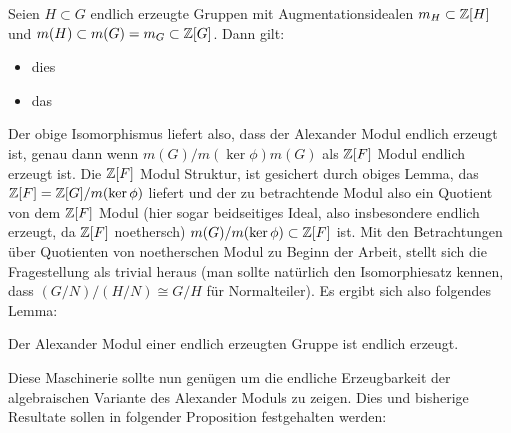 \begin{lem}[Augmentationsideale]
	Seien $H\subset G$ endlich erzeugte Gruppen mit Augmentationsidealen $m_H\subset \mathbb{Z}[H]$ und $m(H)\subset m(G)=m_G\subset \mathbb{Z}[G]$. Dann gilt:
	\begin{itemize}
		\item dies
		\item das
	\end{itemize}
\end{lem}
Der obige Isomorphismus liefert also, dass der Alexander Modul endlich erzeugt ist, genau dann wenn $m(G)/m(\ker\phi)m(G)$ als $\mathbb{Z}[F]$ Modul endlich erzeugt ist. Die $\mathbb{Z}[F]$ Modul Struktur, ist gesichert durch obiges Lemma, das $\mathbb{Z}[F]=\mathbb{Z}[G]/m(\ker\phi)$ liefert und der zu betrachtende Modul also ein Quotient von dem $\mathbb{Z}[F]$ Modul (hier sogar beidseitiges Ideal, also insbesondere endlich erzeugt, da $\mathbb{Z}[F]$ noethersch) $m(G)/m(\ker\phi) \subset \mathbb{Z}[F]$ ist. Mit den Betrachtungen über Quotienten von noetherschen Modul zu Beginn der Arbeit, stellt sich die Fragestellung als trivial heraus (man sollte natürlich den Isomorphiesatz kennen, dass $(G/N)/(H/N)\cong G/H$ für Normalteiler). Es ergibt sich also folgendes Lemma:

\begin{lem}
	Der Alexander Modul einer endlich erzeugten Gruppe ist endlich erzeugt.
\end{lem}



Diese Maschinerie sollte nun genügen um die endliche Erzeugbarkeit der algebraischen Variante des Alexander Moduls zu zeigen. Dies und bisherige Resultate sollen in folgender Proposition festgehalten werden:

